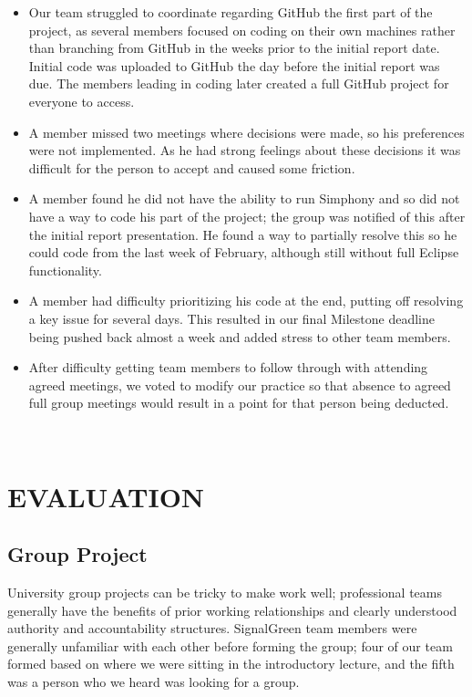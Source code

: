 \documentclass[11pt]{article}
\begin{document}
\begin{enumerate}
\begin{itemize}\itemsep0pt
\item Our team struggled to coordinate regarding GitHub the first part of the project, as several members focused on coding on their own machines rather than branching from GitHub in the weeks prior to the initial report date. Initial code was uploaded to GitHub the day before the initial report was due. The members leading in coding later created a full GitHub project for everyone to access. 
\item A member missed two meetings where decisions were made, so his preferences were not implemented. As he had strong feelings about these decisions it was difficult for the person to accept and caused some friction.
\item A member found he did not have the ability to run Simphony and so did not have a way to code his part of the project; the group was notified of this after the initial report presentation. He found a way to partially resolve this so he could code from the last week of February, although still without full Eclipse functionality. 
\item A member had difficulty prioritizing his code at the end, putting off resolving a key issue for several days. This resulted in our final Milestone deadline being pushed back almost a week and added stress to other team members.
\item After difficulty getting team members to follow through with attending agreed meetings, we voted to modify our practice so that absence to agreed full group meetings would result in a point for that person being deducted.
\end{itemize}
\\


\section{EVALUATION}


\subsection{Group Project}

University group projects can be tricky to make work well; professional teams generally have the benefits of prior working relationships and clearly understood authority and accountability structures. SignalGreen team members were generally unfamiliar with each other before forming the group; four of our team formed based on where we were sitting in the introductory lecture, and the fifth was a person who we heard was looking for a group. 


\end{enumerate}
\end{document}
